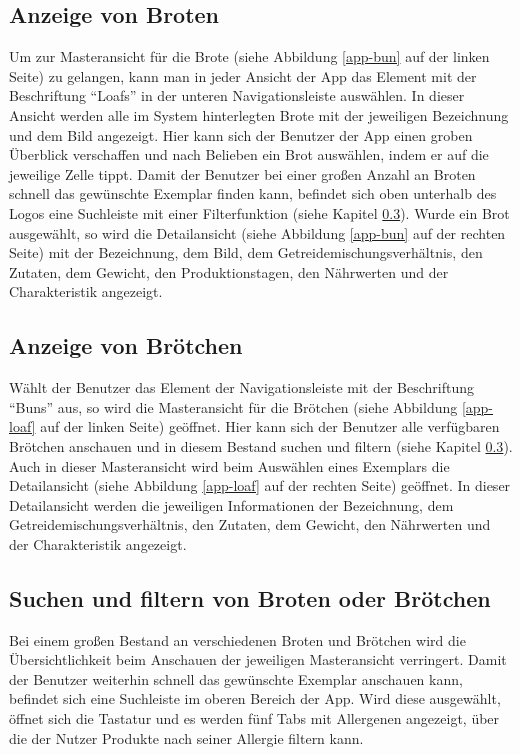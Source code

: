 \subsection{Anzeige von Broten}
Um zur Masteransicht für die Brote (siehe Abbildung \ref{app-bun} auf der linken Seite) zu gelangen, kann man in jeder Ansicht der App das Element mit der Beschriftung \enquote{Loafs} in der unteren Navigationsleiste auswählen.
In dieser Ansicht werden alle im System hinterlegten Brote mit der jeweiligen Bezeichnung und dem Bild angezeigt.
Hier kann sich der Benutzer der App einen groben Überblick verschaffen und nach Belieben ein Brot auswählen, indem er auf die jeweilige Zelle tippt.
Damit der Benutzer bei einer großen Anzahl an Broten schnell das gewünschte Exemplar finden kann, befindet sich oben unterhalb des Logos eine Suchleiste mit einer Filterfunktion (siehe Kapitel \ref{app-filter}).
Wurde ein Brot ausgewählt, so wird die Detailansicht (siehe Abbildung \ref{app-bun} auf der rechten Seite) mit der Bezeichnung, dem Bild, dem Getreidemischungsverhältnis, den Zutaten, dem Gewicht, den Produktionstagen, den Nährwerten und der Charakteristik angezeigt.

\clearpage

\subsection{Anzeige von Brötchen}
Wählt der Benutzer das Element der Navigationsleiste mit der Beschriftung \enquote{Buns} aus, so wird die Masteransicht für die Brötchen (siehe Abbildung \ref{app-loaf} auf der linken Seite) geöffnet. Hier kann sich der Benutzer alle verfügbaren Brötchen anschauen und in diesem Bestand suchen und filtern (siehe Kapitel \ref{app-filter}). Auch in dieser Masteransicht wird beim Auswählen eines Exemplars die Detailansicht (siehe Abbildung \ref{app-loaf} auf der rechten Seite) geöffnet.
In dieser Detailansicht werden die jeweiligen Informationen der Bezeichnung, dem Getreidemischungsverhältnis, den Zutaten, dem Gewicht, den Nährwerten und der Charakteristik angezeigt.


\clearpage

\subsection{Suchen und filtern von Broten oder Brötchen} \label{app-filter}
Bei einem großen Bestand an verschiedenen Broten und Brötchen wird die Übersichtlichkeit beim Anschauen der jeweiligen Masteransicht verringert. Damit der Benutzer weiterhin schnell das gewünschte Exemplar anschauen kann, befindet sich eine Suchleiste im oberen Bereich der App. Wird diese ausgewählt, öffnet sich die Tastatur und es werden fünf Tabs mit Allergenen angezeigt, über die der Nutzer Produkte nach seiner Allergie filtern kann.

